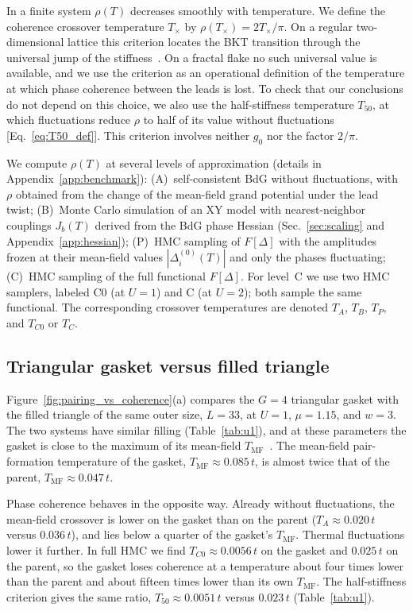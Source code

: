 \documentclass[aps,prb,twocolumn,superscriptaddress,floatfix]{revtex4-2}
\newcommand{\Tmf}{T_{\mathrm{MF}}}
\begin{document}
In a finite system $\rho(T)$ decreases smoothly with temperature. We define
the coherence crossover temperature $T_\times$ by $\rho(T_\times) =
2T_\times/\pi$. On a regular two-dimensional lattice this criterion locates
the BKT transition through the universal jump of the
stiffness~\cite{NK77}. On a fractal flake no such universal value is
available, and we use the criterion as an operational definition of the
temperature at which phase coherence between the leads is lost. To check that
our conclusions do not depend on this choice, we also use the half-stiffness
temperature $T_{50}$, at which fluctuations reduce $\rho$ to half of its value
without fluctuations [Eq.~\eqref{eq:T50_def}]. This criterion involves neither
$g_0$ nor the factor $2/\pi$.

We compute $\rho(T)$ at several levels of approximation (details in
Appendix~\ref{app:benchmark}):
(A)~self-consistent BdG without fluctuations, with $\rho$ obtained from the
change of the mean-field grand potential under the lead twist;
(B)~Monte Carlo simulation of an XY model with nearest-neighbor couplings
$J_b(T)$ derived from the BdG phase Hessian (Sec.~\ref{sec:scaling} and
Appendix~\ref{app:hessian});
(P)~HMC sampling of $F[\Delta]$ with the amplitudes frozen at their
mean-field values $|\Delta_i^{(0)}(T)|$ and only the phases fluctuating;
(C)~HMC sampling of the full functional $F[\Delta]$. For level~C we use two
HMC samplers, labeled C0 (at $U=1$) and C (at $U=2$); both sample the same
functional. The corresponding crossover temperatures are denoted $T_A$,
$T_B$, $T_P$, and $T_{C0}$ or $T_C$.

\subsection{Triangular gasket versus filled triangle}

Figure~\ref{fig:pairing_vs_coherence}(a) compares the $G=4$ triangular gasket
with the filled triangle of the same outer size, $L = 33$, at $U = 1$,
$\mu = 1.15$, and $w = 3$. The two systems have similar filling
(Table~\ref{tab:u1}), and at these parameters the gasket is close to the
maximum of its mean-field $\Tmf$~\cite{Iliasov2024}. The mean-field
pair-formation temperature of the gasket, $\Tmf \approx 0.085\,t$, is almost
twice that of the parent, $\Tmf \approx 0.047\,t$.

Phase coherence behaves in the opposite way. Already without fluctuations,
the mean-field crossover is lower on the gasket than on the parent
($T_A \approx 0.020\,t$ versus $0.036\,t$), and lies below a quarter of the
gasket's $\Tmf$. Thermal fluctuations lower it further. In full HMC we find
$T_{C0} \approx 0.0056\,t$ on the gasket and $0.025\,t$ on the parent, so the
gasket loses coherence at a temperature about four times lower than the parent
and about fifteen times lower than its own $\Tmf$. The half-stiffness
criterion gives the same ratio, $T_{50} \approx 0.0051\,t$ versus $0.023\,t$
(Table~\ref{tab:u1}).
\end{document}
